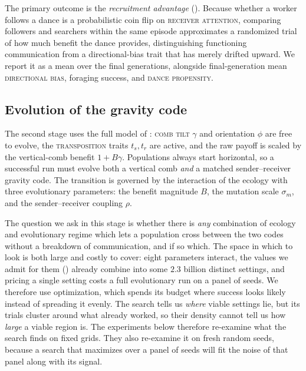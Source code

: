 \documentclass[11pt]{article}
\newcommand{\trait}[1]{\textsc{#1}}
\begin{document}
The primary outcome is the \emph{recruitment advantage} ().
Because whether a worker follows a dance is a probabilistic coin flip on
\trait{receiver attention}, comparing followers and searchers within the same
episode approximates a randomized trial of how much benefit the dance
provides, distinguishing functioning communication from a directional-bias
trait that has merely drifted upward. We report it as a mean over
the final generations, alongside final-generation mean \trait{directional bias}, foraging
success, and \trait{dance propensity}.

\subsection{Evolution of the gravity code}
\label{sec:setup-transition}
The second stage uses the full model of : \trait{comb tilt} $\gamma$
and orientation $\phi$ are free to evolve, the \trait{transposition} traits $t_s, t_r$ are
active, and the raw payoff is scaled by the vertical-comb benefit
$1 + B\gamma$. Populations always start horizontal, so a successful run must
evolve both a vertical comb \emph{and} a matched sender--receiver gravity code.
The transition is governed by the interaction of the ecology with three
evolutionary parameters: the benefit magnitude $B$, the mutation scale
$\sigma_m$, and the sender--receiver coupling $\rho$. 

The question we ask in this stage is whether there is \emph{any} combination of
ecology and evolutionary regime which lets a population cross between the two
codes without a breakdown of communication, and if so which. The space in which
to look is both large and costly to cover: eight parameters interact, the values
we admit for them () already combine into some $2.3$
billion distinct settings, and pricing a single setting costs a full evolutionary
run on a panel of seeds. We therefore use optimization, which spends its budget
where success looks likely instead of spreading it evenly.
The search tells us \emph{where} viable settings lie, but its
trials cluster around what already worked, so their density cannot tell us how
\emph{large} a viable region is. The experiments below therefore re-examine
what the search finds on fixed grids. They also re-examine it on fresh random
seeds, because a search that maximizes over a panel of seeds will fit the
noise of that panel along with its signal.
\end{document}

